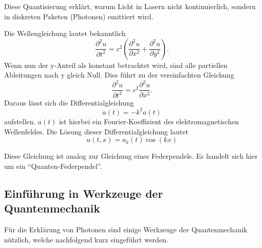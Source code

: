 Diese Quantisierung erklärt, warum Licht in Lasern nicht kontinuierlich, sondern in diskreten Paketen (Photonen) emittiert wird. %

Die Wellengleichung lautet bekanntlich
\begin{equation}
    \frac{\partial^2 u}{\partial t^2} = c^2 \left( \frac{\partial^2 u}{\partial x^2} + \frac{\partial^2 u}{\partial y^2} \right).
\end{equation}
Wenn nun der y-Anteil als konstant betrachtet wird, sind alle partiellen Ableitungen nach y gleich Null.
Dies führt zu der vereinfachten Gleichung
\begin{equation}
    \frac{\partial^2 u}{\partial t^2} = c^2 \frac{\partial^2 u}{\partial x^2}.
\end{equation}
Daraus lässt sich die Differentialgleichung
\begin{equation}
    \ddot{a}(t) = -k^2 a(t)
\end{equation}
aufstellen.
$a(t)$ ist hierbei ein Fourier-Koeffizient des elektromagnetischen Wellenfeldes.
Die Lösung dieser Differentialgleichung lautet
\begin{equation}
    u(t,x) = a_k(t) \cos(kx)
\end{equation}






Diese Gleichung ist analog zur Gleichung eines Federpendels.
Es handelt sich hier um ein ``Quanten-Federpendel''.    
%

\subsection{Einführung in Werkzeuge der Quantenmechanik\label{fourier:subsection:werkzeugeQuantenmechanik}}
Für die Erklärung von Photonen sind einige Werkzeuge der Quantenmechanik nützlich, welche nachfolgend kurz eingeführt werden.

